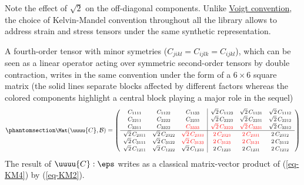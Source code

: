 \documentclass[
  letterpaper,
  DIV=11,
  numbers=noendperiod]{scrreprt}
\begin{document}
\begin{tcolorbox}[enhanced jigsaw, left=2mm, bottomrule=.15mm, colbacktitle=quarto-callout-note-color!10!white, colback=white, colframe=quarto-callout-note-color-frame, rightrule=.15mm, bottomtitle=1mm, toptitle=1mm, titlerule=0mm, title=\textcolor{quarto-callout-note-color}{\faInfo}\hspace{0.5em}{Note}, toprule=.15mm, arc=.35mm, opacityback=0, opacitybacktitle=0.6, leftrule=.75mm, breakable, coltitle=black]

Note the effect of \(\sqrt{2}\) on the off-diagonal components. Unlike
\href{https://en.wikipedia.org/wiki/Voigt_notation}{Voigt convention},
the choice of Kelvin-Mandel convention throughout all the library allows
to address strain and stress tensors under the same synthetic
representation.

\end{tcolorbox}

A fourth-order tensor with minor symetries
(\(C_{jikl}=C_{ijlk}=C_{ijkl}\)), which can be seen as a linear operator
acting over symmetric second-order tensors by double contraction, writes
in the same convention under the form of a \(6\times 6\) square matrix
(the solid lines separate blocks affected by different factors whereas
the colored components highlight a central block playing a major role in
the sequel) \begin{equation}\phantomsection\label{eq-KM4}{
\small
\Mat(\uuuu{C},\mathcal{B})=
   \left(
   \begin{array}{ccc|ccc}
   C_{1111} & C_{1122} & C_{1133} & \sqrt{2}\,C_{1123} & \sqrt{2}\,C_{1131} & \sqrt{2}\,C_{1112} \\
   C_{2211} & C_{2222} & C_{2233} & \sqrt{2}\,C_{2223} & \sqrt{2}\,C_{2231} & \sqrt{2}\,C_{2212} \\
   C_{3311} & C_{3322} & \color{red}C_{3333} & \color{red}\sqrt{2}\,C_{3323} & \color{red}\sqrt{2}\,C_{3331} & \sqrt{2}\,C_{3312} \\
   \hline
   \sqrt{2}\,C_{2311} & \sqrt{2}\,C_{2322} & \color{red}\sqrt{2}\,C_{2333} & \color{red}2\,C_{2323} & \color{red}2\,C_{2331} & 2\,C_{2312} \\
   \sqrt{2}\,C_{3111} & \sqrt{2}\,C_{3122} & \color{red}\sqrt{2}\,C_{3133} & \color{red}2\,C_{3123} & \color{red}2\,C_{3131} & 2\,C_{3112} \\
   \sqrt{2}\,C_{1211} & \sqrt{2}\,C_{1222} & \sqrt{2}\,C_{1233} & 2\,C_{1223} & 2\,C_{1231} & 2\,C_{1212}
   \end{array}
   \right)
}\end{equation} The result of \(\uuuu{C}:\eps\) writes as a classical
matrix-vector product of (\ref{eq-KM4}) by (\ref{eq-KM2}).
\end{document}
